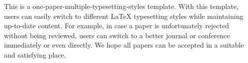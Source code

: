 This is a one-paper-multiple-typesetting-styles template. With this template, users can easily switch to different LaTeX typesetting styles while maintaining up-to-date content. For example, in case a paper is unfortunately rejected without being reviewed, users can switch to a better journal or conference immediately or even directly. We hope all papers can be accepted in a suitable and satisfying place. 